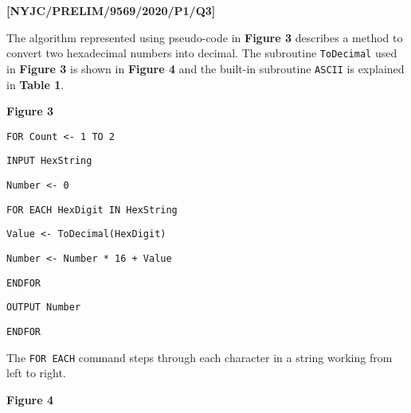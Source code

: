 \item \textbf{{[}NYJC/PRELIM/9569/2020/P1/Q3{]} }

The algorithm represented using pseudo-code in \textbf{Figure 3} describes
a method to convert two hexadecimal numbers into decimal. The subroutine
\texttt{ToDecimal} used in\textbf{ Figure 3} is shown in \textbf{Figure
4} and the built-in subroutine \texttt{ASCII} is explained in \textbf{Table
1}. 
\noindent \begin{center}
\textbf{Figure 3} 
\par\end{center}

\noindent %
\noindent\begin{minipage}[t]{1\columnwidth}%
\texttt{FOR Count <- 1 TO 2 }

\texttt{\qquad{}INPUT HexString }

\texttt{\qquad{}Number <- 0 }

\texttt{\qquad{}FOR EACH HexDigit IN HexString }

\texttt{\qquad{}\qquad{}Value <- ToDecimal(HexDigit) }

\texttt{\qquad{}\qquad{}Number <- Number {*} 16 + Value }

\texttt{\qquad{}ENDFOR }

\texttt{\qquad{}OUTPUT Number }

\texttt{ENDFOR}%
\end{minipage}

The \texttt{FOR EACH} command steps through each character in a string
working from left to right. 
\noindent \begin{center}
\textbf{Figure 4} 
\par\end{center}

